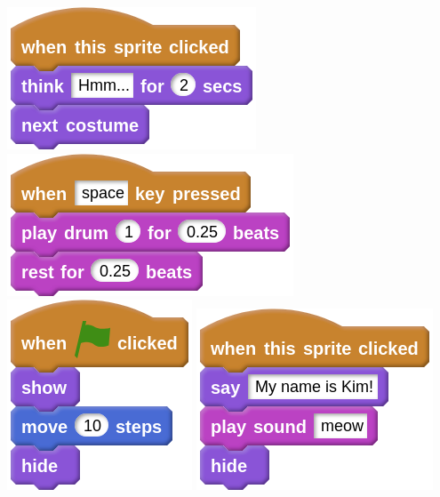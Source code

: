 \documentclass[letterpaper,12pt]{article}
\begin{document}
\includegraphics[scale=.7,valign=t]{q3_script0.png} \hspace{1cm}
\includegraphics[scale=.7,valign=t]{q3_script1.png} \hspace{1cm}
\includegraphics[scale=.7,valign=t]{q3_script2.png} \hspace{1cm}
\includegraphics[scale=.7,valign=t]{q3_script3.png} \hspace{1cm}
\end{document}
